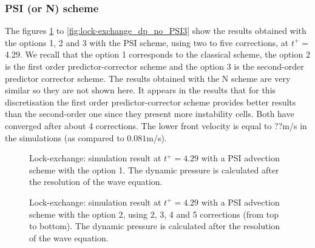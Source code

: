\subsubsection{PSI (or N) scheme}
The figures \ref{fig:lock-exchange_dp_no_PSI1} to \ref{fig:lock-exchange_dp_no_PSI3} show the results
obtained with the options 1, 2 and 3 with the PSI scheme, using two to five corrections, at $t^+=$ 4.29.
We recall that the option 1 corresponds to the classical scheme, the option 2 is the first order predictor-corrector
scheme and the option 3 is the second-order predictor corrector scheme.
The results obtained with the N scheme are very similar so they are not shown here.
It appears in the results that for this discretisation the first order predictor-corrector scheme
provides better results than the second-order one since they present more instability cells.
Both have converged after about 4 corrections.
The lower front velocity is equal to $??$m/s in the simulations (as compared to $0.081$m/s).
\begin{figure}[ht]
  \begin{center}
    \caption{Lock-exchange: simulation result at $t^+=4.29$ with a PSI advection scheme with the option 1.
      The dynamic pressure is calculated after the resolution of the wave equation.}
    \label{fig:lock-exchange_dp_no_PSI1}
  \end{center}
\end{figure}
\begin{figure}[ht]
  \begin{center}
    \caption{Lock-exchange: simulation result at $t^+=4.29$ with a PSI advection scheme with the option 2,
      using 2, 3, 4 and 5 corrections (from top to bottom).
      The dynamic pressure is calculated after the resolution of the wave equation.}
    \label{fig:lock-exchange_dp_no_PSI2}
  \end{center}
\end{figure}
